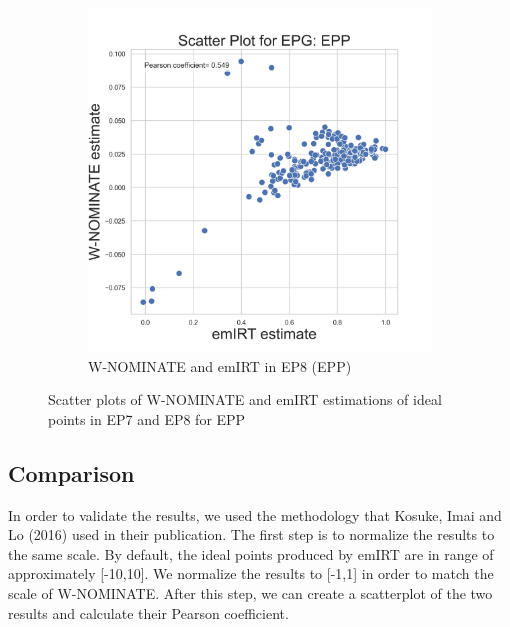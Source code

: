 \documentclass[a4paper,12pt]{report}
\begin{document}
\begin{figure}[H]
\begin{subfigure}[b]{0.48\textwidth}
                        \includegraphics[width=\textwidth]{Graphs/ScatterEMWNOMINATE_8_EPG_EPP}
                        \caption{W-NOMINATE and emIRT in EP8 (EPP)}
                        \label{fig:WNOMINATE_EPPSCATTER_8}
                    \end{subfigure}
                    \caption{Scatter plots of W-NOMINATE and emIRT estimations of ideal points in EP7 and EP8 for EPP}
                    \label{fig:WNOMINATE_SCATTER_EPP}
                \end{figure}

            \subsection{Comparison}
                In order to validate the results, we used the methodology that Kosuke, Imai and Lo (2016) used in their
                publication.
                The first step is to normalize the results to the same scale.
                By default, the ideal points produced by emIRT are in range of approximately [-10,10].
                We normalize the results to [-1,1] in order to match the scale of W-NOMINATE. After this step, we can
                create a
                scatterplot of the two results and calculate their Pearson
                coefficient.
\end{document}
